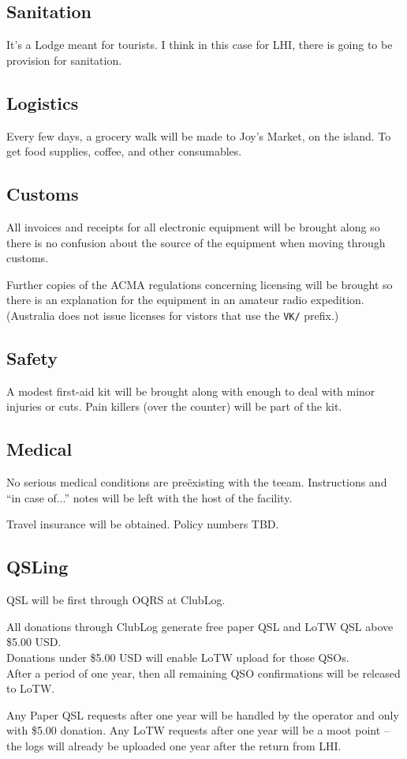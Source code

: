 \documentclass[11pt]{article}
\begin{document}
\subsection{Sanitation}

It's a Lodge meant for tourists.  I think in this case for LHI, there
is going to be provision for sanitation.

\subsection{Logistics}

Every few days, a grocery walk will be made to Joy's Market, on the island.
To get food supplies, coffee, and other consumables.

\subsection{Customs}

All invoices and receipts for all electronic equipment will be brought along so
there is no confusion about the source of the equipment when moving through customs.
\par
Further copies of the ACMA regulations concerning licensing will be brought so
there is an explanation for the equipment in an amateur radio expedition. (Australia
does not issue licenses for vistors that use the {\texttt{VK/}} prefix.)

\subsection{Safety}
A modest first-aid kit will be brought along with enough to deal with minor injuries or cuts.
Pain killers (over the counter) will be part of the kit.

\subsection{Medical}
No serious medical conditions are pre\"existing with the teeam.  Instructions and
``in case of...'' notes will be left with the host of the facility.
\par
Travel insurance will be obtained.  Policy numbers TBD.

\subsection{QSLing}

QSL will be first through OQRS at ClubLog.
\par
All donations through ClubLog generate free paper QSL and LoTW QSL above \$5.00 USD.\\
Donations under \$5.00 USD will enable LoTW upload for those QSOs.\\
After a period of one year, then all remaining QSO confirmations will be released to
LoTW.
\par
Any Paper QSL requests after one year will be handled by the operator and only with \$5.00 
donation.  Any LoTW requests after one year will be a moot point -- the logs will already be
uploaded one year after the return from LHI.
\par
\end{document}
